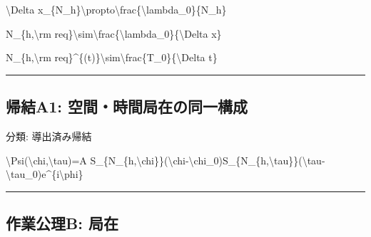 \documentclass[
  a4paper,
]{ltjsarticle}
\newenvironment{Shaded}{}{}
\newcommand{\NormalTok}[1]{#1}
\begin{document}
\begin{Shaded}
\begin{Highlighting}[]
\NormalTok{\textbackslash{}Delta x\_\{N\_h\}\textbackslash{}propto\textbackslash{}frac\{\textbackslash{}lambda\_0\}\{N\_h\}}
\end{Highlighting}
\end{Shaded}

\begin{Shaded}
\begin{Highlighting}[]
\NormalTok{N\_\{h,\textbackslash{}rm req\}\textbackslash{}sim\textbackslash{}frac\{\textbackslash{}lambda\_0\}\{\textbackslash{}Delta x\}}
\end{Highlighting}
\end{Shaded}

\begin{Shaded}
\begin{Highlighting}[]
\NormalTok{N\_\{h,\textbackslash{}rm req\}\^{}\{(t)\}\textbackslash{}sim\textbackslash{}frac\{T\_0\}\{\textbackslash{}Delta t\}}
\end{Highlighting}
\end{Shaded}

\begin{center}\rule{0.5\linewidth}{0.5pt}\end{center}

\subsection{帰結A1:
空間・時間局在の同一構成}\label{ux5e30ux7d50a1-ux7a7aux9593ux6642ux9593ux5c40ux5728ux306eux540cux4e00ux69cbux6210}

分類: 導出済み帰結

\begin{Shaded}
\begin{Highlighting}[]
\NormalTok{\textbackslash{}Psi(\textbackslash{}chi,\textbackslash{}tau)=A S\_\{N\_\{h,\textbackslash{}chi\}\}(\textbackslash{}chi{-}\textbackslash{}chi\_0)S\_\{N\_\{h,\textbackslash{}tau\}\}(\textbackslash{}tau{-}\textbackslash{}tau\_0)e\^{}\{i\textbackslash{}phi\}}
\end{Highlighting}
\end{Shaded}

\begin{center}\rule{0.5\linewidth}{0.5pt}\end{center}

\subsection{作業公理B:
局在}\label{ux4f5cux696dux516cux7406b-ux5c40ux5728}
\end{document}
